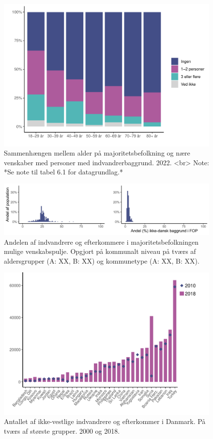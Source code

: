 \documentclass[
]{book}
\begin{document}
\begin{figure}
\includegraphics[width=1\linewidth]{en-befolkning-blander-sig_files/figure-latex/fig-6-1-1} \caption{Sammenhængen mellem alder på majoritetsbefolkning og nære venskaber med personer med indvandrerbaggrund. 2022. <br> Note: *Se note til tabel 6.1 for datagrundlag.*}\label{fig:fig-6-1}
\end{figure}

\begin{figure}
\includegraphics[width=1\linewidth]{images/Figur_6_2} \caption{Andelen af indvandrere og efterkommere i majoritetsbefolkningen mulige venskabspulje. Opgjort på kommunalt niveau på tværs af aldersgrupper (A: XX, B: XX) og kommunetype (A: XX, B: XX).}\label{fig:fig-6-2}
\end{figure}

\begin{figure}
\includegraphics[width=1\linewidth]{en-befolkning-blander-sig_files/figure-latex/fig-6-3-1} \caption{Antallet af ikke-vestlige indvandrere og efterkommer i Danmark. På tværs af største grupper. 2000 og 2018.}\label{fig:fig-6-3}
\end{figure}
\end{document}
